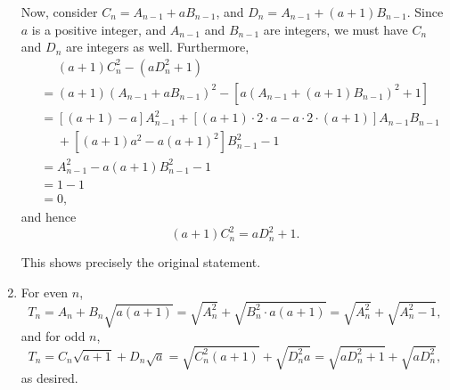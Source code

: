 \begin{enumerate}
          Now, consider \(C_n = A_{n - 1} + a B_{n - 1}\), and \(D_n = A_{n - 1} + (a + 1) B_{n - 1}\). Since \(a\) is a positive integer, and \(A_{n - 1}\) and \(B_{n - 1}\) are integers, we must have \(C_n\) and \(D_n\) are integers as well. Furthermore,
          \begin{align*}
               & \phantom{=} (a + 1) C_n^2 - (a D_n^2 + 1)                                                                                   \\
               & = (a + 1) \left(A_{n - 1} + a B_{n - 1}\right)^2 - \left[a \left(A_{n - 1} + (a + 1) B_{n - 1}\right)^2 + 1\right]          \\
               & = \left[(a + 1) - a\right] A_{n - 1}^2 + \left[(a + 1) \cdot 2 \cdot a - a \cdot 2 \cdot (a + 1)\right] A_{n - 1} B_{n - 1} \\
               & \phantom{=} + [(a + 1) a^2 - a (a + 1)^2] B_{n - 1}^2 - 1                                                                   \\
               & = A_{n - 1}^2 - a(a + 1) B_{n - 1}^2 - 1                                                                                    \\
               & = 1 - 1                                                                                                                     \\
               & = 0,
          \end{align*}
          and hence
          \[
              (a + 1) C_n^2 = a D_n^2 + 1.
          \]

          This shows precisely the original statement.

    \item For even \(n\),
          \[
              T_n = A_n + B_n \sqrt{a (a + 1)} = \sqrt{A_n^2} + \sqrt{B_n^2 \cdot a (a + 1)} = \sqrt{A_n^2} + \sqrt{A_n^2 - 1},
          \]
          and for odd \(n\),
          \[
              T_n = C_n\sqrt{a + 1} + D_n \sqrt{a} = \sqrt{C_n^2 (a + 1)} + \sqrt{D_n^2 a} = \sqrt{a D_n^2 + 1} + \sqrt{a D_n^2},
          \]
          as desired.
\end{enumerate}